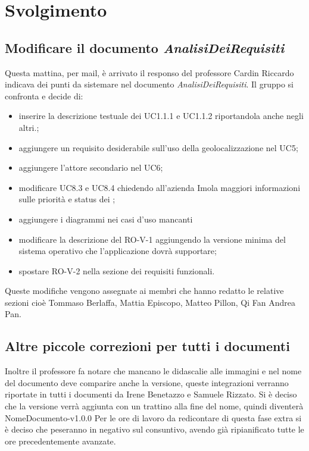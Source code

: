 \section{Svolgimento}
\subsection{Modificare il documento \emph{AnalisiDeiRequisiti}}
Questa mattina, per mail, è arrivato il responso del professore Cardin Riccardo indicava dei punti da sistemare nel documento \emph{AnalisiDeiRequisiti}.
Il gruppo si confronta e decide di:
    \begin{itemize}
        \item inserire la descrizione testuale dei UC1.1.1 e UC1.1.2 riportandola anche negli altri.;
        \item aggiungere un requisito desiderabile sull'uso della geolocalizzazione nel UC5;
        \item aggiungere l'attore secondario nel UC6;
        \item modificare UC8.3 e UC8.4 chiedendo all'azienda Imola maggiori informazioni sulle priorità e status dei ;
        \item aggiungere i diagrammi nei casi d'uso mancanti
        \item modificare la descrizione del RO-V-1 aggiungendo la versione minima del sistema operativo che l'applicazione dovrà supportare;
        \item spostare RO-V-2 nella sezione dei requisiti funzionali.
    \end{itemize}
Queste modifiche vengono assegnate ai membri che hanno redatto le relative sezioni cioè Tommaso Berlaffa, Mattia Episcopo, Matteo Pillon, Qi Fan Andrea Pan. 
\subsection{Altre piccole correzioni per tutti i documenti}
Inoltre il professore fa notare che mancano le didascalie alle immagini e nel nome del documento deve comparire anche la versione, queste integrazioni verranno riportate in tutti i documenti da Irene Benetazzo e Samuele Rizzato.
Si è deciso che la versione verrà aggiunta con un trattino alla fine del nome, quindi diventerà NomeDocumento-v1.0.0
Per le ore di lavoro da redicontare di questa fase extra si è deciso che peseranno in negativo sul consuntivo, avendo già ripianificato tutte le ore precedentemente avanzate.